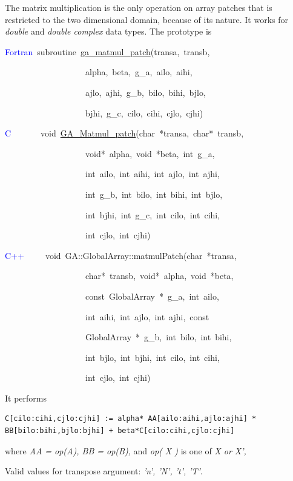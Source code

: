 The matrix multiplication is the only operation on array patches that
is restricted to the two dimensional domain, because of its nature.
It works for\emph{ double} and \emph{double complex} data types. The
prototype is

\textcolor{blue}{Fortran}~subroutine~\href{https://hpc.pnl.gov/globalarrays/api/f_op_api.html\#ga_matmul_patch}{ga\_{}matmul\_{}patch}(transa,~transb,~

~~~~~~~~~~~~~~~~~~~alpha,~beta,~g\_a,~ailo,~aihi,~

~~~~~~~~~~~~~~~~~~~ajlo,~ajhi,~g\_b,~bilo,~bihi,~bjlo,~

~~~~~~~~~~~~~~~~~~~bjhi,~g\_c,~cilo,~cihi,~cjlo,~cjhi)~

\textcolor{blue}{C}~~~~~~~void~\href{https://hpc.pnl.gov/globalarrays/api/c_op_api.html\#ga_matmul_patch}{GA\_{}Matmul\_{}patch}(char~{*}transa,~char{*}~transb,

~~~~~~~~~~~~~~~~~~~void{*}~alpha,~void~{*}beta,~int~g\_a,~

~~~~~~~~~~~~~~~~~~~int~ailo,~int~aihi,~int~ajlo,~int~ajhi,~

~~~~~~~~~~~~~~~~~~~int~g\_b,~int~bilo,~int~bihi,~int~bjlo,~

~~~~~~~~~~~~~~~~~~~int~bjhi,~int~g\_c,~int~cilo,~int~cihi,~

~~~~~~~~~~~~~~~~~~~int~cjlo,~int~cjhi)~

\textcolor{blue}{C++}~~~~~void~GA::GlobalArray::matmulPatch(char~{*}transa,

~~~~~~~~~~~~~~~~~~~char{*}~transb,~void{*}~alpha,~void~{*}beta,~

~~~~~~~~~~~~~~~~~~~const~GlobalArray~{*}~g\_a,~int~ailo,~

~~~~~~~~~~~~~~~~~~~int~aihi,~int~ajlo,~int~ajhi,~const~

~~~~~~~~~~~~~~~~~~~GlobalArray~{*}~g\_b,~int~bilo,~int~bihi,~

~~~~~~~~~~~~~~~~~~~int~bjlo,~int~bjhi,~int~cilo,~int~cihi,~

~~~~~~~~~~~~~~~~~~~int~cjlo,~int~cjhi)


It performs
\begin{lstlisting}[style=cppnoframe]
C[cilo:cihi,cjlo:cjhi] := alpha* AA[ailo:aihi,ajlo:ajhi] * BB[bilo:bihi,bjlo:bjhi] + beta*C[cilo:cihi,cjlo:cjhi] 
\end{lstlisting}
where \emph{AA = op(A), BB = op(B),} and \emph{op( X )} is one of \emph{X or X',}

Valid values for transpose argument:\emph{ 'n', 'N', 't', 'T'}.

